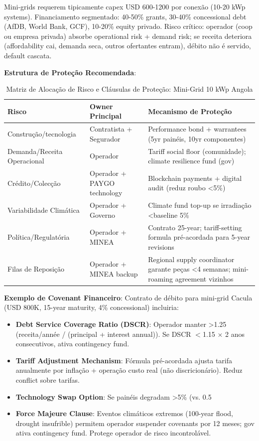 \documentclass[12pt, a4paper]{article}
\begin{document}
Mini-grids requerem tipicamente capex USD 600-1200 por conexão (10-20 kWp systems). Financiamento segmentado: 40-50\% grants, 30-40\% concessional debt (AfDB, World Bank, GCF), 10-20\% equity privado. Risco crítico: operador (coop ou empresa privada) absorbe operational risk + demand risk; se receita deteriora (affordability cai, demanda seca, outros ofertantes entram), débito não é servido, default cascata.

\textbf{Estrutura de Proteção Recomendada}:

\begin{table}[H]
\centering
\caption{Matriz de Alocação de Risco e Cláusulas de Proteção: Mini-Grid 10 kWp Angola}
\label{tab:risk_allocation}
\small
\begin{tabular}{lll}
\toprule
\rowcolor{LightBlue}\textbf{Risco} & \textbf{Owner Principal} & \textbf{Mecanismo de Proteção} \\
\midrule
Construção/tecnologia & Contratista + Segurador & Performance bond + warrantees (5yr painéis, 10yr componentes) \\
\midrule
Demanda/Receita Operacional & Operador & Tariff social floor (comunidade); climate resilience fund (gov) \\
\midrule
Crédito/Colecção & Operador + PAYGO technology & Blockchain payments + digital audit (reduz roubo <5\%) \\
\midrule
Variabilidade Climática & Operador + Governo & Climate fund top-up se irradiação <baseline 5\% \\
\midrule
Política/Regulatória & Operador + MINEA & Contrato 25-year; tariff-setting formula pré-acordada para 5-year revisions \\
\midrule
Filas de Reposição & Operador + MINEA backup & Regional supply coordinator garante peças <4 semanas; mini-roaming agreement vizinhos \\
\bottomrule
\end{tabular}
\end{table}

\textbf{Exemplo de Covenant Financeiro}: Contrato de débito para mini-grid Cacula (USD 800K, 15-year maturity, 4\% concessional) incluiria:
\begin{itemize}
\item \textbf{Debt Service Coverage Ratio (DSCR)}: Operador manter >1.25 (receita/année / (principal + interest annual)). Se DSCR $<$1.15 × 2 anos consecutivos, ativa contingency fund.
\item \textbf{Tariff Adjustment Mechanism}: Fórmula pré-acordada ajusta tarifa anualmente por inflação + operação custo real (não discricionário). Reduz conflict sobre tarifas.
\item \textbf{Technology Swap Option}: Se painéis degradam >5\% (vs. 0.5%
\item \textbf{Force Majeure Clause}: Eventos climáticos extremos (100-year flood, drought insufrible) permitem operador suspender covenants por 12 meses; gov ativa contingency fund. Protege operador de risco incontrolável.
\end{itemize}
\end{document}
